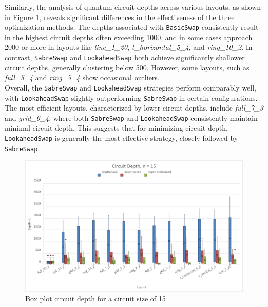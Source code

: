Similarly, the analysis of quantum circuit depths across various layouts, as shown in Figure \ref{fig:chart-box-plot-depth}, reveals significant differences in the effectiveness of the three optimization methods. The depths associated with \lstinline{BasicSwap} consistently result in the highest circuit depths often exceeding 1000, and in some cases approach 2000 or more in layouts like \textit{line\_1\_20}, \textit{t\_horizontal\_5\_4}, and \textit{ring\_10\_2}. In contrast, \lstinline{SabreSwap} and \lstinline{LookaheadSwap} both achieve significantly shallower circuit depths, generally clustering below 500. However, some layouts, such as \textit{full\_5\_4} and \textit{ring\_5\_4} show occasional outliers. \\
Overall, the \lstinline{SabreSwap} and \lstinline{LookaheadSwap} strategies perform comparably well, with \lstinline{LookaheadSwap} slightly outperforming \lstinline{SabreSwap} in certain configurations. The most efficient layouts, characterized by lower circuit depths, include \textit{full\_7\_3} and \textit{grid\_6\_4}, where both \lstinline{SabreSwap} and \lstinline{LookaheadSwap} consistently maintain minimal circuit depth. This suggests that for minimizing circuit depth, \lstinline{LookaheadSwap} is generally the most effective strategy, closely followed by \lstinline{SabreSwap}. \\
\begin{figure}[htb]
    \centering
    \includegraphics[width=\linewidth]{image/chart_box_plot_depth.png}
    \caption{Box plot circuit depth for a circuit size of 15}
    \label{fig:chart-box-plot-depth}
\end{figure}

